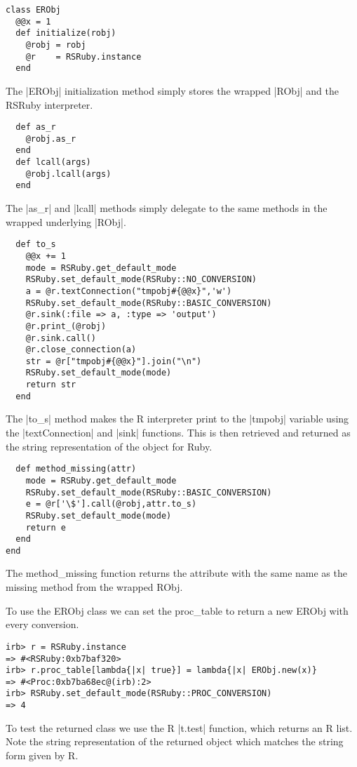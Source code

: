 \documentclass[a4paper,12pt]{book}
\begin{document}
\begin{Verbatim}
class ERObj
  @@x = 1
  def initialize(robj)
    @robj = robj
    @r    = RSRuby.instance
  end
\end{Verbatim}

The |ERObj| initialization method simply stores the wrapped |RObj| and the RSRuby interpreter.

\begin{Verbatim}
  def as_r
    @robj.as_r
  end
  def lcall(args)
    @robj.lcall(args)
  end
\end{Verbatim}

The |as_r| and |lcall| methods simply delegate to the same methods in the wrapped underlying |RObj|.

\begin{Verbatim}
  def to_s
    @@x += 1
    mode = RSRuby.get_default_mode
    RSRuby.set_default_mode(RSRuby::NO_CONVERSION)
    a = @r.textConnection("tmpobj#{@@x}",'w')
    RSRuby.set_default_mode(RSRuby::BASIC_CONVERSION)
    @r.sink(:file => a, :type => 'output')
    @r.print_(@robj)
    @r.sink.call()
    @r.close_connection(a)
    str = @r["tmpobj#{@@x}"].join("\n")
    RSRuby.set_default_mode(mode)
    return str
  end
\end{Verbatim}

The |to_s| method makes the R interpreter print to the |tmpobj| variable using the |textConnection| and |sink| functions. This is then retrieved and returned as the string representation of the object for Ruby.

\begin{Verbatim}
  def method_missing(attr)
    mode = RSRuby.get_default_mode
    RSRuby.set_default_mode(RSRuby::BASIC_CONVERSION)
    e = @r['\$'].call(@robj,attr.to_s)
    RSRuby.set_default_mode(mode)
    return e
  end
end
\end{Verbatim}

The method\_missing function returns the attribute with the same name as the missing method from the wrapped RObj.

To use the ERObj class we can set the proc\_table to return a new ERObj with every conversion.

\begin{Verbatim}
irb> r = RSRuby.instance
=> #<RSRuby:0xb7baf320>
irb> r.proc_table[lambda{|x| true}] = lambda{|x| ERObj.new(x)}
=> #<Proc:0xb7ba68ec@(irb):2>
irb> RSRuby.set_default_mode(RSRuby::PROC_CONVERSION)
=> 4
\end{Verbatim}

To test the returned class we use the R |t.test| function, which returns an R list. Note the string representation of the returned object which matches the string form given by R.
\end{document}
